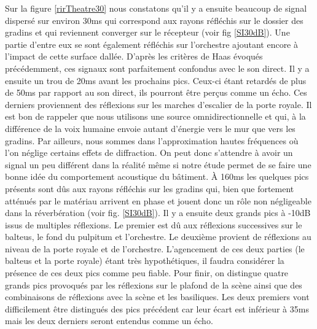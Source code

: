 Sur la figure \ref{rirTheatre30} nous constatons qu'il y a ensuite beaucoup de signal dispersé sur environ 30ms qui correspond aux rayons réfléchis sur le dossier des gradins et qui reviennent converger sur le récepteur (voir fig \ref{SI30dB}). Une partie d'entre eux se sont également réfléchis sur l'orchestre ajoutant encore à l'impact de cette surface dallée. D'après les critères de Haas évoqués précédemment, ces signaux sont parfaitement confondus avec le son direct. Il y a ensuite un trou de 20ms avant les prochains pics. Ceux-ci étant retardés de plus de 50ms par rapport au son direct, ils pourront être perçus comme un écho. Ces derniers proviennent des réflexions sur les marches d'escalier de la porte royale. Il est bon de rappeler que nous utilisons une source omnidirectionnelle et qui, à la différence de la voix humaine envoie autant d'énergie vers le mur que vers les gradins. Par ailleurs, nous sommes dans l'approximation hautes fréquences où l'on néglige certains effets de diffraction. On peut donc s'attendre à avoir un signal un peu différent dans la réalité même si notre étude permet de se faire une bonne idée du comportement acoustique du bâtiment. À 160ms les quelques pics présents sont dûs aux rayons réfléchis sur les gradins qui, bien que fortement atténués par le matériau arrivent en phase et jouent donc un rôle non négligeable dans la réverbération (voir fig. \ref{SI30dB}). Il y a ensuite deux grands pics à -10dB issus de multiples réflexions. Le premier est dû aux réflexions successives sur le \gls{balteus}, le fond du \gls{pulpitum} et l'orchestre. Le deuxième provient de réflexions au niveau de la porte royale et de l'orchestre. L'agencement de ces deux parties (le \gls{balteus} et la porte royale) étant très hypothétiques, il faudra considérer la présence de ces deux pics comme peu fiable. Pour finir, on distingue quatre grands pics provoqués par les réflexions sur le plafond de la scène ainsi que des combinaisons de réflexions avec la scène et les basiliques. Les deux premiers vont difficilement être distingués des pics précédent car leur écart est inférieur à 35ms mais les deux derniers seront entendus comme un écho.
%
